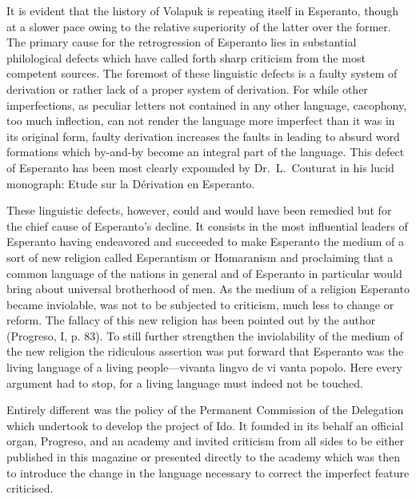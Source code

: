 It is evident that the history of Volapuk is repeating itself in Esperanto, though at a slower pace owing to the relative superiority of the latter over the former. The primary cause for the retrogression of Esperanto lies in substantial philological defects which have called forth sharp criticism from the most competent sources. The foremost of these linguistic defects is a faulty system of derivation or rather lack of a proper system of derivation. For while other imperfections, as peculiar letters not contained in any other language, cacophony, too much inflection, can not render the language more imperfect than it was in its original form, faulty derivation increases the faults in leading to absurd word formations which by-and-by become an integral part of the language. This defect of Esperanto has been most clearly expounded by Dr.~L.~Couturat in his lucid monograph: Etude sur la Dérivation en Esperanto. 

These linguistic defects, however, could and would have been remedied but for the chief cause of Esperanto's decline. It consists in the most influential leaders of Esperanto having endeavored and succeeded to make Esperanto the medium of a sort of new religion called Esperantism or Homaranism and proclaiming that a common language of the nations in general and of Esperanto in particular would bring about universal brotherhood of men. As the medium of a religion Esperanto became inviolable, was not to be subjected to criticism, much less to change or reform. The fallacy of this new religion has been pointed out by the author (Progreso, I, p. 83). To still further strengthen the inviolability of the medium of the new religion the ridiculous assertion was put forward that Esperanto was the living language of a living people---vivanta lingvo de vi vanta popolo. Here every argument had to stop, for a living language must indeed not be touched. 

Entirely different was the policy of the Permanent Commission of the Delegation which undertook to develop the project of Ido. It founded in its behalf an official organ, Progreso, and an academy and invited criticism from all sides to be either published in this magazine or presented directly to the academy which was then to introduce the change in the language necessary to correct the imperfect feature criticised. 

